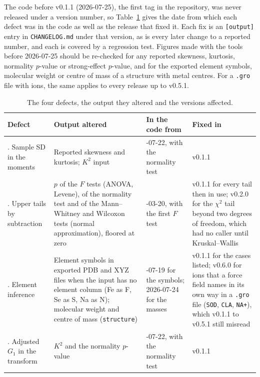 \documentclass[11pt,a4paper]{article}
\begin{document}
The code before v0.1.1 (2026-07-25), the first tag in the repository, was never
released under a version number, so Table~\ref{tab:defects} gives the date from
which each defect was in the code as well as the release that fixed it. Each fix
is an \texttt{[output]} entry in \texttt{CHANGELOG.md} under that version, as is
every later change to a reported number, and each is covered by a regression
test. Figures made with the tools before 2026-07-25 should be re-checked for any
reported skewness, kurtosis, normality $p$-value or strong-effect $p$-value, and
for the exported element symbols, molecular weight or centre of mass of a
structure with metal centres. For a \texttt{.gro} file with ions, the same
applies to every release up to v0.5.1.

\begin{table}[htbp]
\centering
\caption{The four defects, the output they altered and the versions affected.}
\label{tab:defects}
\footnotesize
\begin{tabular}{@{}>{\raggedright\arraybackslash}p{2.9cm}>{\raggedright\arraybackslash}p{5.0cm}>{\raggedright\arraybackslash}p{2.6cm}>{\raggedright\arraybackslash}p{3.9cm}@{}}
\toprule
\textbf{Defect} & \textbf{Output altered} & \textbf{In the code from} & \textbf{Fixed in} \\
\midrule
1. Sample SD in the moments & Reported skewness and kurtosis; $K^2$ input & 2026-07-22, with the normality test & v0.1.1 \\
2. Upper tails by subtraction & $p$ of the $F$ tests (ANOVA, Levene), of the normality test and of the Mann--Whitney and Wilcoxon tests (normal approximation), floored at zero & 2026-03-20, with the first $F$ test & v0.1.1 for every tail then in use; v0.2.0 for the $\chi^2$ tail beyond two degrees of freedom, which had no caller until Kruskal--Wallis \\
3. Element inference & Element symbols in exported PDB and XYZ files when the input has no element column (Fe as F, Se as S, Na as N); molecular weight and centre of mass (\texttt{structure}) & 2026-07-19 for the symbols; 2026-07-24 for the masses & v0.1.1 for the cases listed; v0.6.0 for ions that a force field names in its own way in a \texttt{.gro} file (\texttt{SOD}, \texttt{CLA}, \texttt{NA+}), which v0.1.1 to v0.5.1 still misread \\
4. Adjusted $G_1$ in the transform & $K^2$ and the normality $p$-value & 2026-07-22, with the normality test & v0.1.1 \\
\bottomrule
\end{tabular}
\end{table}
\end{document}
